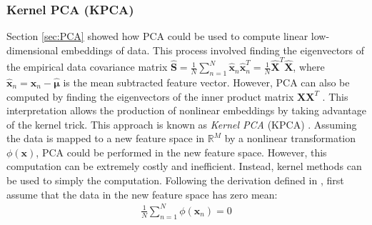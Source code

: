\subsubsection{Kernel PCA (KPCA)} \label{sec:KPCA}
Section \ref{sec:PCA} showed how PCA could be used to compute linear low-dimensional embeddings of data.  This process involved finding the eigenvectors of the empirical data covariance matrix $\hat{\bm{S}} = \frac{1}{N}\sum_{n=1}^{N}\hat{\bm{x}}_{n}\hat{\bm{x}}_{n}^{T} = \frac{1}{N}\hat{\bm{X}}^{T}\hat{\bm{X}}$, where $\hat{\bm{x}}_{n} = \bm{x}_{n} - \hat{\bm{\mu}}$ is the mean subtracted feature vector.  However, PCA can also be computed by finding the eigenvectors of the inner product matrix $\bm{X}\bm{X}^{T}$ \citep{Murphy2012,Wang2014KPCAReview}.  This interpretation allows the production of nonlinear embeddings by taking advantage of the kernel trick.  This approach is known as \textit{Kernel PCA} (KPCA) \citep{Scholkopf1999KPCA}.  Assuming the data is mapped to a new feature space in $\mathbb{R}^{M}$ by a nonlinear transformation $\phi(\bm{x})$, PCA could be performed in the new feature space.  However, this computation can be extremely costly and inefficient.  Instead, kernel methods can be used to simply the computation.  Following the derivation defined in \citep{Wang2014KPCAReview}, first assume that the data in the new feature space has zero mean:
\begin{align}
	\frac{1}{N} \sum_{n=1}^{N}\phi(\bm{x}_{n}) = 0	
\end{align}

